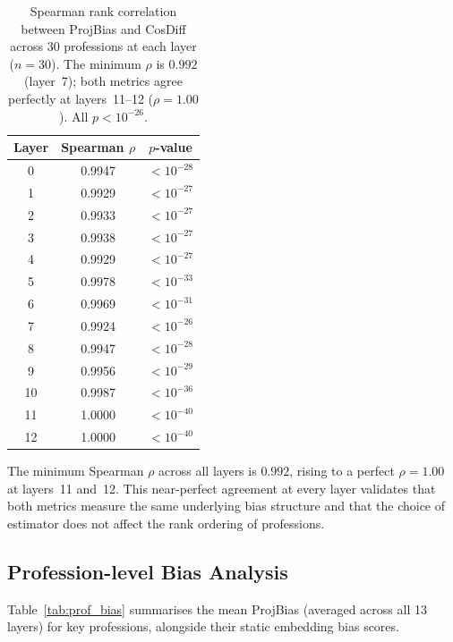 \documentclass[11pt,a4paper]{article}
\begin{document}
\begin{table}[h]
\centering
\small
\begin{tabular}{ccc}
\toprule
\textbf{Layer} & \textbf{Spearman $\rho$} & \textbf{$p$-value} \\
\midrule
 0 & 0.9947 & $< 10^{-28}$ \\
 1 & 0.9929 & $< 10^{-27}$ \\
 2 & 0.9933 & $< 10^{-27}$ \\
 3 & 0.9938 & $< 10^{-27}$ \\
 4 & 0.9929 & $< 10^{-27}$ \\
 5 & 0.9978 & $< 10^{-33}$ \\
 6 & 0.9969 & $< 10^{-31}$ \\
 7 & 0.9924 & $< 10^{-26}$ \\
 8 & 0.9947 & $< 10^{-28}$ \\
 9 & 0.9956 & $< 10^{-29}$ \\
10 & 0.9987 & $< 10^{-36}$ \\
11 & 1.0000 & $< 10^{-40}$ \\
12 & 1.0000 & $< 10^{-40}$ \\
\bottomrule
\end{tabular}
\caption{Spearman rank correlation between ProjBias and CosDiff across 30
professions at each layer ($n=30$). The minimum $\rho$ is $0.992$ (layer~7);
both metrics agree perfectly at layers~11--12 ($\rho=1.00$). All $p < 10^{-26}$.}
\label{tab:spearman}
\end{table}

The minimum Spearman $\rho$ across all layers is $0.992$, rising to a perfect
$\rho = 1.00$ at layers~11 and~12. This near-perfect agreement at every layer
validates that both metrics measure the same underlying bias structure and that
the choice of estimator does not affect the rank ordering of professions.

\subsection{Profession-level Bias Analysis}

Table~\ref{tab:prof_bias} summarises the mean ProjBias (averaged across all 13
layers) for key professions, alongside their static embedding bias scores.
\end{document}
